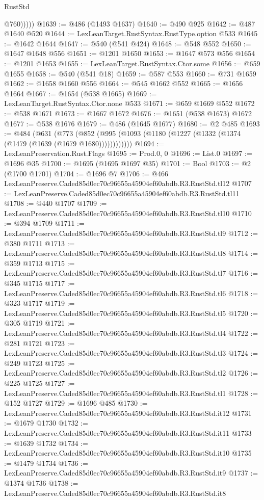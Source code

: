 \begin{lexlean}{RustStd}
\begin{coremodule}
              @760)))))
@1639 := @486 (@1493 @1637)
@1640 := @490 @925
@1642 := @487 @1640 @520
@1644 := LexLeanTarget.RustSyntax.RustType.option @533
@1645 := @1642 @1644
@1647 := @540 (@541 @424)
@1648 := @548 @552
@1650 := @1647 @1648 @556
@1651 := @1201 @1650
@1653 := @1647 @573 @556
@1654 := @1201 @1653
@1655 := LexLeanTarget.RustSyntax.Ctor.some
@1656 := @659 @1655
@1658 := @540 (@541 @18)
@1659 := @587 @553
@1660 := @731 @1659
@1662 := @1658 @1660 @556
@1664 := @545 @1662 @552
@1665 := @1656 @1664
@1667 := @1654 (@538 @1665)
@1669 := LexLeanTarget.RustSyntax.Ctor.none @533
@1671 := @659 @1669 @552
@1672 := @538 @1671
@1673 := @1667 @1672
@1676 := @1651 (@538 @1673) @1672
@1677 := @538 @1676
@1679 := @486 (@1645 @1677)
@1680 := @2 @485
@1693 := @484
    (@631
      (@773 (@852 (@995 (@1093 (@1180 (@1227 (@1332 (@1374 (@1479 (@1639 (@1679 @1680))))))))))))
@1694 := LexLeanPreservation.Rust.Flags
@1695 := Prod.{0, 0}
@1696 := List.{0}
@1697 := @1696 @35
@1700 := @1695 (@1695 @1697 @35)
@1701 := Bool
@1703 := @2 (@1700 @1701)
@1704 := @1696 @7
@1706 := @466 LexLeanPreserve.Caded85d0ec70c96655a45904ef60abdb.R3.RustStd.tl12
@1707 := LexLeanPreserve.Caded85d0ec70c96655a45904ef60abdb.R3.RustStd.tl11
@1708 := @440 @1707
@1709 := LexLeanPreserve.Caded85d0ec70c96655a45904ef60abdb.R3.RustStd.tl10
@1710 := @394 @1709
@1711 := LexLeanPreserve.Caded85d0ec70c96655a45904ef60abdb.R3.RustStd.tl9
@1712 := @380 @1711
@1713 := LexLeanPreserve.Caded85d0ec70c96655a45904ef60abdb.R3.RustStd.tl8
@1714 := @359 @1713
@1715 := LexLeanPreserve.Caded85d0ec70c96655a45904ef60abdb.R3.RustStd.tl7
@1716 := @345 @1715
@1717 := LexLeanPreserve.Caded85d0ec70c96655a45904ef60abdb.R3.RustStd.tl6
@1718 := @323 @1717
@1719 := LexLeanPreserve.Caded85d0ec70c96655a45904ef60abdb.R3.RustStd.tl5
@1720 := @305 @1719
@1721 := LexLeanPreserve.Caded85d0ec70c96655a45904ef60abdb.R3.RustStd.tl4
@1722 := @281 @1721
@1723 := LexLeanPreserve.Caded85d0ec70c96655a45904ef60abdb.R3.RustStd.tl3
@1724 := @249 @1723
@1725 := LexLeanPreserve.Caded85d0ec70c96655a45904ef60abdb.R3.RustStd.tl2
@1726 := @225 @1725
@1727 := LexLeanPreserve.Caded85d0ec70c96655a45904ef60abdb.R3.RustStd.tl1
@1728 := @152 @1727
@1729 := @1696 @485
@1730 := LexLeanPreserve.Caded85d0ec70c96655a45904ef60abdb.R3.RustStd.it12
@1731 := @1679 @1730
@1732 := LexLeanPreserve.Caded85d0ec70c96655a45904ef60abdb.R3.RustStd.it11
@1733 := @1639 @1732
@1734 := LexLeanPreserve.Caded85d0ec70c96655a45904ef60abdb.R3.RustStd.it10
@1735 := @1479 @1734
@1736 := LexLeanPreserve.Caded85d0ec70c96655a45904ef60abdb.R3.RustStd.it9
@1737 := @1374 @1736
@1738 := LexLeanPreserve.Caded85d0ec70c96655a45904ef60abdb.R3.RustStd.it8

\end{coremodule}
\end{lexlean}
